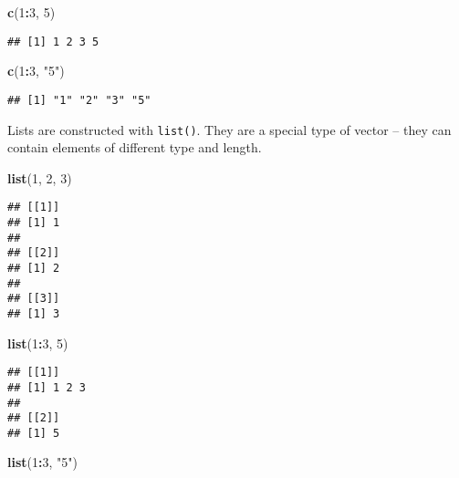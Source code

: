 \documentclass[]{book}
\newenvironment{Shaded}{\begin{snugshade}}{\end{snugshade}}
\newcommand{\DecValTok}[1]{\textcolor[rgb]{0.00,0.00,0.81}{#1}}
\newcommand{\KeywordTok}[1]{\textcolor[rgb]{0.13,0.29,0.53}{\textbf{#1}}}
\newcommand{\NormalTok}[1]{#1}
\newcommand{\OperatorTok}[1]{\textcolor[rgb]{0.81,0.36,0.00}{\textbf{#1}}}
\newcommand{\StringTok}[1]{\textcolor[rgb]{0.31,0.60,0.02}{#1}}
\begin{document}
\begin{Shaded}
\begin{Highlighting}[]
\KeywordTok{c}\NormalTok{(}\DecValTok{1}\OperatorTok{:}\DecValTok{3}\NormalTok{, }\DecValTok{5}\NormalTok{)}
\end{Highlighting}
\end{Shaded}

\begin{verbatim}
## [1] 1 2 3 5
\end{verbatim}

\begin{Shaded}
\begin{Highlighting}[]
\KeywordTok{c}\NormalTok{(}\DecValTok{1}\OperatorTok{:}\DecValTok{3}\NormalTok{, }\StringTok{"5"}\NormalTok{)}
\end{Highlighting}
\end{Shaded}

\begin{verbatim}
## [1] "1" "2" "3" "5"
\end{verbatim}

Lists are constructed with \texttt{list()}.
They are a special type of vector -- they can contain elements of different type and length.

\begin{Shaded}
\begin{Highlighting}[]
\KeywordTok{list}\NormalTok{(}\DecValTok{1}\NormalTok{, }\DecValTok{2}\NormalTok{, }\DecValTok{3}\NormalTok{)}
\end{Highlighting}
\end{Shaded}

\begin{verbatim}
## [[1]]
## [1] 1
## 
## [[2]]
## [1] 2
## 
## [[3]]
## [1] 3
\end{verbatim}

\begin{Shaded}
\begin{Highlighting}[]
\KeywordTok{list}\NormalTok{(}\DecValTok{1}\OperatorTok{:}\DecValTok{3}\NormalTok{, }\DecValTok{5}\NormalTok{)}
\end{Highlighting}
\end{Shaded}

\begin{verbatim}
## [[1]]
## [1] 1 2 3
## 
## [[2]]
## [1] 5
\end{verbatim}

\begin{Shaded}
\begin{Highlighting}[]
\KeywordTok{list}\NormalTok{(}\DecValTok{1}\OperatorTok{:}\DecValTok{3}\NormalTok{, }\StringTok{"5"}\NormalTok{)}
\end{Highlighting}
\end{Shaded}
\end{document}
